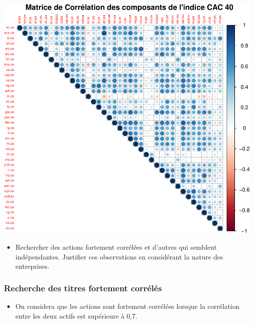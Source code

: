 \documentclass[
]{article}
\providecommand{\tightlist}{%
  \setlength{\itemsep}{0pt}\setlength{\parskip}{0pt}}
\begin{document}
\includegraphics{TP-1_files/figure-latex/correl-matrix-1.pdf}

\begin{itemize}
\tightlist
\item
  Rechercher des actions fortement corrélées et d'autres qui semblent
  indépendantes. Justifier ces observations en considérant la nature des
  entreprises.
\end{itemize}

\hypertarget{recherche-des-titres-fortement-corruxe9luxe9s}{%
\subsubsection{Recherche des titres fortement
corrélés}\label{recherche-des-titres-fortement-corruxe9luxe9s}}

\begin{itemize}
\tightlist
\item
  On considera que les actions sont fortement corrélées lorsque la
  corrélation entre les deux actifs est supérieure à 0,7.
\end{itemize}
\end{document}
